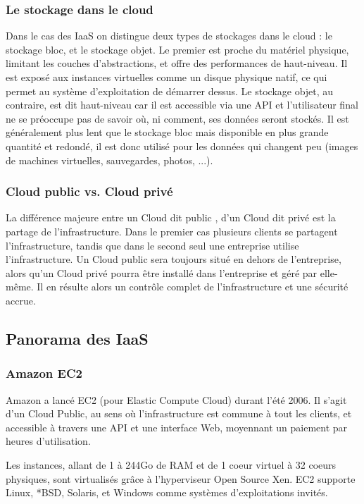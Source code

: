 \documentclass{report}
\begin{document}
\subsubsection{Le stockage dans le cloud}
Dans le cas des IaaS on distingue deux types de stockages dans le cloud : le stockage bloc, et le stockage objet. Le premier est proche du matériel physique, limitant les couches d'abstractions, et offre des performances de haut-niveau. Il est exposé aux instances virtuelles comme un disque physique natif, ce qui permet au système d'exploitation de démarrer dessus.\newline
Le stockage objet, au contraire, est dit \og haut-niveau \fg car il est accessible via une API et l'utilisateur final ne se préoccupe pas de savoir où, ni comment, ses données seront stockés. Il est généralement plus lent que le stockage bloc mais disponible en plus grande quantité et redondé, il est donc utilisé pour les données qui changent peu (images de machines virtuelles, sauvegardes, photos, ...).

\subsubsection{Cloud public vs. Cloud privé}
La différence majeure entre un Cloud dit \og public \fg, d'un Cloud dit \og privé \fg est la partage de l'infrastructure. Dans le premier cas plusieurs clients se partagent l'infrastructure, tandis que dans le second seul une entreprise utilise l'infrastructure.\newline
Un Cloud public sera toujours situé en dehors de l'entreprise, alors qu'un Cloud privé pourra être installé dans l'entreprise et géré par elle-même. Il en résulte alors un contrôle complet de l'infrastructure et une sécurité accrue.

\subsection{Panorama des IaaS}
\subsubsection{Amazon EC2}
Amazon a lancé EC2 (pour Elastic Compute Cloud) durant l'été 2006. Il s'agit d'un Cloud Public, au sens où l'infrastructure est commune à tout les clients, et accessible à travers une API et une interface Web, moyennant un paiement par heures d'utilisation.

Les instances, allant de 1 à 244Go de RAM et de 1 coeur virtuel à 32 coeurs physiques, sont virtualisés grâce à l'hyperviseur Open Source Xen. EC2 supporte Linux, *BSD, Solaris, et Windows comme systèmes d'exploitations invités.
\end{document}
